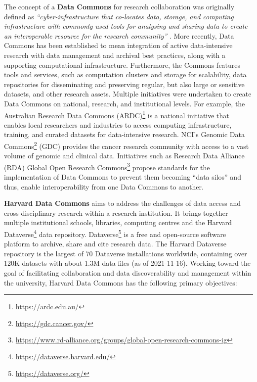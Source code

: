 The concept of a \textbf{Data Commons} for research collaboration was
originally defined as \emph{``cyber-infrastructure that co-locates data,
storage, and computing infrastructure with commonly used tools for
analysing and sharing data to create an interoperable resource for the
research community''}
\cite{Grossman 2016}. More recently,
Data Commons has been established to mean integration of active
data-intensive research with data management and archival best
practices, along with a supporting computational infrastructure.
Furthermore, the Commons features tools and services, such as
computation clusters and storage for scalability, data repositories for
disseminating and preserving regular, but also large or sensitive
datasets, and other research assets. Multiple initiatives were
undertaken to create Data Commons on national, research, and
institutional levels. For example, the Australian Research Data Commons
(ARDC)\footnote{\url{https://ardc.edu.au/}} 
\cite{Barker 2019} is a national
initiative that enables local researchers and industries to access
computing infrastructure, training, and curated datasets for
data-intensive research. NCI's Genomic
Data Commons\footnote{\url{https://gdc.cancer.gov/}} (GDC)
\cite{Jensen 2017} provides
the cancer research community with access to a vast volume of genomic
and clinical data. Initiatives such as
Research Data Alliance (RDA) Global Open Research Commons\footnote{\url{https://www.rd-alliance.org/groups/global-open-research-commons-ig}}
propose standards for
the implementation of Data Commons to prevent them becoming ``data
silos'' and thus, enable interoperability from one Data Commons to
another.

\textbf{Harvard Data Commons}
\cite{Crosas 2020} aims to address the
challenges of data access and cross-disciplinary research within a
research institution. It brings together multiple institutional schools,
libraries, computing centres and the
Harvard
Dataverse\footnote{\url{https://dataverse.harvard.edu/}} data repository.
Dataverse\footnote{\url{https://dataverse.org/}}
\cite{Crosas 2011} is a free
and open-source software platform to archive, share and cite research
data. The Harvard Dataverse repository is the largest of 70 Dataverse
installations worldwide, containing over 120K datasets with about 1.3M
data files (as of 2021-11-16). Working toward the goal of facilitating
collaboration and data discoverability and management within the
university, Harvard Data Commons has the following primary objectives:

